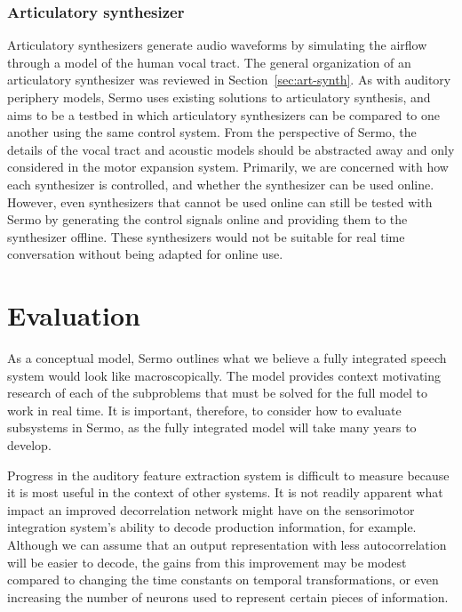 \subsubsection{Articulatory synthesizer}

Articulatory synthesizers
generate audio waveforms
by simulating the airflow
through a model of the human vocal tract.
The general organization of an
articulatory synthesizer
was reviewed in Section~\ref{sec:art-synth}.
As with auditory periphery models,
Sermo uses existing solutions
to articulatory synthesis,
and aims to be a testbed
in which articulatory synthesizers
can be compared to one another
using the same control system.
From the perspective of Sermo,
the details of the vocal tract
and acoustic models
should be abstracted away
and only considered
in the motor expansion system.
Primarily, we are concerned with
how each synthesizer is controlled,
and whether the synthesizer
can be used online.
However, even synthesizers
that cannot be used online
can still be tested with Sermo
by generating the control signals online
and providing them to the synthesizer offline.
These synthesizers would not be suitable
for real time conversation without
being adapted for online use.

\section{Evaluation}

As a conceptual model,
Sermo outlines what we believe a fully integrated
speech system would look like macroscopically.
The model provides context
motivating research of each
of the subproblems that must be solved
for the full model to work in real time.
It is important, therefore,
to consider how to evaluate
subsystems in Sermo,
as the fully integrated model
will take many years to develop.

Progress in the auditory feature extraction system
is difficult to measure
because it is most useful
in the context of other systems.
It is not readily apparent
what impact
an improved decorrelation network
might have on the sensorimotor integration
system's ability to decode production information,
for example.
Although we can assume that
an output representation with
less autocorrelation
will be easier to decode,
the gains from this improvement
may be modest compared to
changing the time constants on temporal transformations,
or even increasing the number of neurons
used to represent certain pieces of information.

